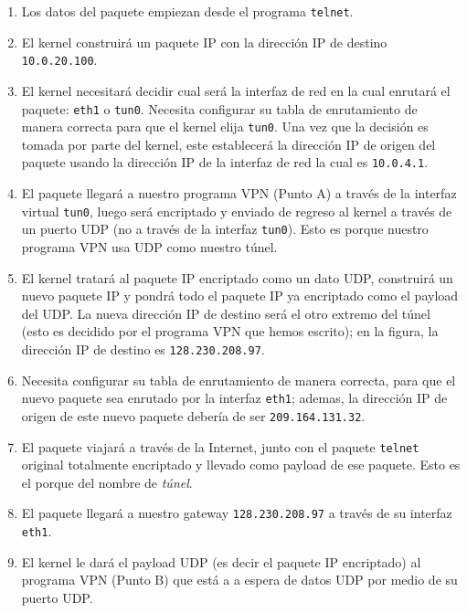 \begin{enumerate}

\item Los datos del paquete empiezan desde el programa {\tt telnet}.

\item El kernel construirá un paquete IP con la dirección IP de destino {\tt 10.0.20.100}. 

\item El kernel necesitará decidir cual será la interfaz de red en la cual enrutará el paquete: {\tt eth1} o {\tt tun0}. Necesita configurar su tabla de enrutamiento de manera correcta para que el kernel elija {\tt tun0}. 
Una vez que la decisión es tomada por parte del kernel, este establecerá la dirección IP de origen del paquete usando la dirección IP de la interfaz de red la cual es {\tt 10.0.4.1}.

\item El paquete llegará a nuestro programa VPN (Punto A) a través de la interfaz virtual {\tt tun0}, luego será encriptado y enviado de regreso al kernel a través de un puerto UDP (no a través de la interfaz {\tt tun0}).
Esto es porque nuestro programa VPN usa UDP como nuestro túnel.

\item El kernel tratará al paquete IP encriptado como un dato UDP, construirá un nuevo paquete IP y pondrá todo el paquete IP ya encriptado como el payload del UDP. La nueva dirección IP de destino será el otro extremo del túnel (esto es decidido por el programa VPN que hemos escrito); en la figura, la dirección IP de destino es {\tt 128.230.208.97}.

\item Necesita configurar su tabla de enrutamiento de manera correcta, para que el nuevo paquete sea enrutado por la interfaz  {\tt eth1}; ademas, la dirección IP de origen de este nuevo paquete debería de ser {\tt 209.164.131.32}.

\item El paquete viajará a través de la Internet, junto con el paquete {\tt telnet} original totalmente encriptado y llevado como payload de ese paquete. Esto es el porque del nombre de {\em túnel}.

\item El paquete llegará a nuestro gateway  {\tt 128.230.208.97} a través de su interfaz {\tt eth1}.

\item El kernel le dará el payload UDP (es decir el paquete IP encriptado) al programa VPN (Punto B) que está a a espera de datos UDP por medio de su puerto UDP.


\end{enumerate}
